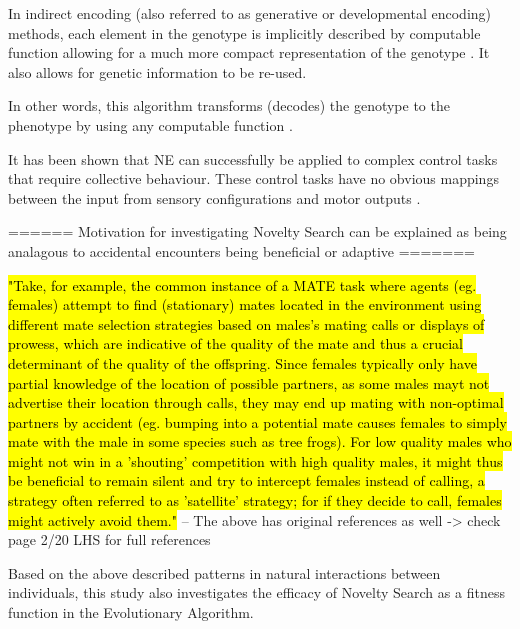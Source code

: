 In indirect encoding (also referred to as generative or developmental encoding) methods, each element in the genotype is implicitly described by computable function allowing for a much more compact representation of the genotype \cite{clune2011performance, stanley2009hypercube}. It also allows for genetic information to be re-used.

In other words, this algorithm transforms (decodes) the genotype to the phenotype by using any computable function \cite{koutnik2010evolving}.






It has been shown that NE can successfully be applied to complex control tasks that require collective behaviour. These control tasks have no obvious mappings between the input from sensory configurations and motor outputs \cite{NitschkeSaEC2012}.







====== Motivation for investigating Novelty Search can be explained as being analagous to accidental encounters being beneficial or adaptive =======

\hl{"Take, for example, the common instance of a MATE task where agents (eg. females) attempt to find (stationary) mates located in the environment using different mate selection strategies based on males's mating calls or displays of prowess, which are indicative of the quality of the mate and thus a crucial determinant of the quality of the offspring. Since females typically only have partial knowledge of the location of possible partners, as some males mayt not advertise their location through calls, they may end up mating with non-optimal partners by accident (eg. bumping into a potential mate causes females to simply mate with the male in some species such as tree frogs). For low quality males who might not win in a 'shouting' competition with high quality males, it might thus be beneficial to remain silent and try to intercept females instead of calling, a strategy often referred to as 'satellite' strategy; for if they decide to call, females might actively avoid them."} \cite{ferreira2018accidental}
-- The above has original references as well -> check page 2/20 LHS for full references

Based on the above described patterns in natural interactions between individuals, this study also investigates the efficacy of Novelty Search as a fitness function in the Evolutionary Algorithm.




